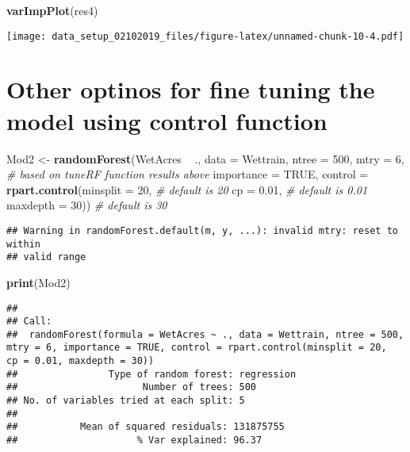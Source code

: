 \documentclass[]{article}
\newenvironment{Shaded}{\begin{snugshade}}{\end{snugshade}}
\newcommand{\KeywordTok}[1]{\textcolor[rgb]{0.13,0.29,0.53}{\textbf{{#1}}}}
\newcommand{\DataTypeTok}[1]{\textcolor[rgb]{0.13,0.29,0.53}{{#1}}}
\newcommand{\DecValTok}[1]{\textcolor[rgb]{0.00,0.00,0.81}{{#1}}}
\newcommand{\FloatTok}[1]{\textcolor[rgb]{0.00,0.00,0.81}{{#1}}}
\newcommand{\StringTok}[1]{\textcolor[rgb]{0.31,0.60,0.02}{{#1}}}
\newcommand{\CommentTok}[1]{\textcolor[rgb]{0.56,0.35,0.01}{\textit{{#1}}}}
\newcommand{\OtherTok}[1]{\textcolor[rgb]{0.56,0.35,0.01}{{#1}}}
\newcommand{\NormalTok}[1]{{#1}}
\begin{document}
\begin{Shaded}
\begin{Highlighting}[]
\KeywordTok{varImpPlot}\NormalTok{(res4)                      }
\end{Highlighting}
\end{Shaded}

\texttt{[image: data\_setup\_02102019\_files/figure-latex/unnamed-chunk-10-4.pdf]}

\section{Other optinos for fine tuning the model using control
function}\label{other-optinos-for-fine-tuning-the-model-using-control-function}

\begin{Shaded}
\begin{Highlighting}[]
\NormalTok{Mod2 <-}\StringTok{ }\KeywordTok{randomForest}\NormalTok{(WetAcres ~}\StringTok{ }\NormalTok{., }
                     \DataTypeTok{data =} \NormalTok{Wettrain, }
                     \DataTypeTok{ntree =} \DecValTok{500}\NormalTok{, }
                     \DataTypeTok{mtry =} \DecValTok{6}\NormalTok{,                                        }\CommentTok{# based on tuneRF function results above}
                     \DataTypeTok{importance =} \OtherTok{TRUE}\NormalTok{,}
                     \DataTypeTok{control =} \KeywordTok{rpart.control}\NormalTok{(}\DataTypeTok{minsplit =} \DecValTok{20}\NormalTok{,           }\CommentTok{# default is 20}
                                             \DataTypeTok{cp =} \FloatTok{0.01}\NormalTok{,               }\CommentTok{# default is 0.01}
                                             \DataTypeTok{maxdepth =} \DecValTok{30}\NormalTok{))          }\CommentTok{# default is 30}
\end{Highlighting}
\end{Shaded}

\begin{verbatim}
## Warning in randomForest.default(m, y, ...): invalid mtry: reset to within
## valid range
\end{verbatim}

\begin{Shaded}
\begin{Highlighting}[]
\KeywordTok{print}\NormalTok{(Mod2)}
\end{Highlighting}
\end{Shaded}

\begin{verbatim}
## 
## Call:
##  randomForest(formula = WetAcres ~ ., data = Wettrain, ntree = 500,      mtry = 6, importance = TRUE, control = rpart.control(minsplit = 20,          cp = 0.01, maxdepth = 30)) 
##                Type of random forest: regression
##                      Number of trees: 500
## No. of variables tried at each split: 5
## 
##           Mean of squared residuals: 131875755
##                     % Var explained: 96.37
\end{verbatim}
\end{document}

